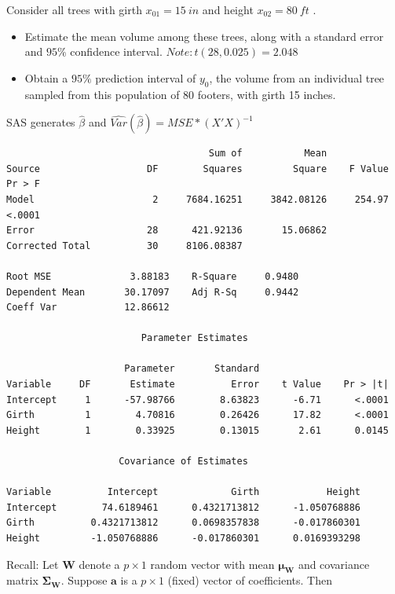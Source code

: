 Consider all trees with girth $x_{01}=15\ in$ and height $x_{02}=80 \ ft$ .
\begin{itemize}
\item Estimate the mean volume among these trees, along with a standard error and $95\%$ confidence interval. $Note: t(28,0.025)=2.048$
\item Obtain a $95\%$ prediction interval of $y_0$, the volume from an 
individual tree sampled from this population of 80 footers, with girth 15 inches.
\end{itemize}
SAS generates $\hat\beta$ and $\widehat{Var}(\hat\beta)=MSE*(X'X)^{-1}$
\begin{large}
\begin{verbatim}
                                    Sum of           Mean
Source                   DF        Squares         Square    F Value    Pr > F
Model                     2     7684.16251     3842.08126     254.97    <.0001
Error                    28      421.92136       15.06862
Corrected Total          30     8106.08387

Root MSE              3.88183    R-Square     0.9480
Dependent Mean       30.17097    Adj R-Sq     0.9442
Coeff Var            12.86612

                        Parameter Estimates

                     Parameter       Standard
Variable     DF       Estimate          Error    t Value    Pr > |t|
Intercept     1      -57.98766        8.63823      -6.71      <.0001
Girth         1        4.70816        0.26426      17.82      <.0001
Height        1        0.33925        0.13015       2.61      0.0145

                    Covariance of Estimates

Variable          Intercept             Girth            Height
Intercept        74.6189461      0.4321713812      -1.050768886
Girth          0.4321713812      0.0698357838      -0.017860301
Height         -1.050768886      -0.017860301      0.0169393298
\end{verbatim}
\end{large}

\newpage

Recall: Let $\textbf{W}$ denote a $p\times 1$ random vector with mean $\boldsymbol{\mu}_{\textbf{W}}$ 
and covariance matrix $\boldsymbol{\Sigma}_{\textbf{W}}$. Suppose $\textbf{a}$ is a $p\times 1$ (fixed) vector of coefficients. Then 
\begin{center}
\end{center}

